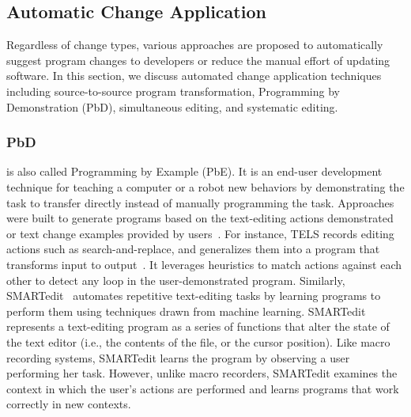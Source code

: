 \documentclass[runningheads,a4paper]{llncs}
\begin{document}
\subsection{Automatic Change Application}
\label{sec:automatic}

Regardless of change types, various approaches are proposed to automatically suggest program changes to developers or reduce the manual effort of updating software. In this section, we discuss automated change application techniques including source-to-source program transformation, Programming by Demonstration (PbD), simultaneous editing, and systematic editing.


\subsubsection{PbD} is also called Programming by Example (PbE). It is an end-user development technique for teaching a computer or a robot new behaviors by demonstrating the task to transfer directly instead of manually programming the task.
Approaches were built to generate programs based on the text-editing actions demonstrated or text change examples provided by users~\cite{Nix1984,WiM1993,LaH1995,LWD2001}. For instance, 
TELS records editing actions such as search-and-replace, and generalizes them into a program that transforms input to output~\cite{WiM1993}. It leverages heuristics to match actions against each other to detect any loop in the user-demonstrated program. 
Similarly, SMARTedit~\cite{LWD2001} automates repetitive text-editing tasks by learning programs to perform them using techniques drawn from machine learning. SMARTedit represents a text-editing program as a series of functions that alter the state of the text editor (i.e., the contents of the file, or the cursor position). Like macro recording systems, SMARTedit learns the program by observing a user performing her task. However, unlike macro recorders, SMARTedit examines the context in which the user's actions are performed and learns programs that work correctly in new contexts. 
\end{document}
